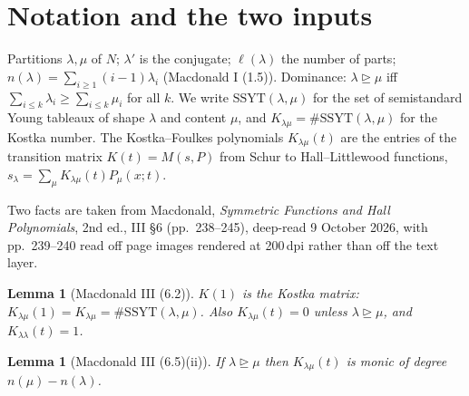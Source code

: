 \documentclass[11pt]{article}
\theoremstyle{plain}
\newtheorem{lemma}[theorem]{Lemma}
\theoremstyle{definition}
\newcommand{\SSYT}{\mathrm{SSYT}}
\DeclareMathOperator{\dom}{\trianglerighteq}
\begin{document}
\section{Notation and the two inputs}

Partitions $\lambda,\mu$ of $N$; $\lambda' $ is the conjugate; $\ell(\lambda)$ the
number of parts; $n(\lambda)=\sum_{i\ge1}(i-1)\lambda_i$ (Macdonald I (1.5)).  Dominance:
$\lambda\dom\mu$ iff $\sum_{i\le k}\lambda_i\ge\sum_{i\le k}\mu_i$ for all $k$.  We write
$\SSYT(\lambda,\mu)$ for the set of semistandard Young tableaux of shape $\lambda$ and
content $\mu$, and $K_{\lambda\mu}=\#\SSYT(\lambda,\mu)$ for the Kostka number.  The
Kostka--Foulkes polynomials $K_{\lambda\mu}(t)$ are the entries of the transition matrix
$K(t)=M(s,P)$ from Schur to Hall--Littlewood functions,
$s_\lambda=\sum_\mu K_{\lambda\mu}(t)P_\mu(x;t)$.

Two facts are taken from Macdonald, \emph{Symmetric Functions and Hall Polynomials}, 2nd
ed., III \S6 (pp.\ 238--245), deep-read 9 October 2026, with pp.\ 239--240 read off page
images rendered at 200\,dpi rather than off the text layer.

\begin{lemma}[Macdonald III (6.2)]\label{lem:at1}
$K(1)$ is the Kostka matrix: $K_{\lambda\mu}(1)=K_{\lambda\mu}=\#\SSYT(\lambda,\mu)$.
Also $K_{\lambda\mu}(t)=0$ unless $\lambda\dom\mu$, and $K_{\lambda\lambda}(t)=1$.
\end{lemma}

\begin{lemma}[Macdonald III (6.5)(ii)]\label{lem:monic}
If $\lambda\dom\mu$ then $K_{\lambda\mu}(t)$ is \emph{monic} of degree
$n(\mu)-n(\lambda)$.
\end{lemma}
\end{document}

